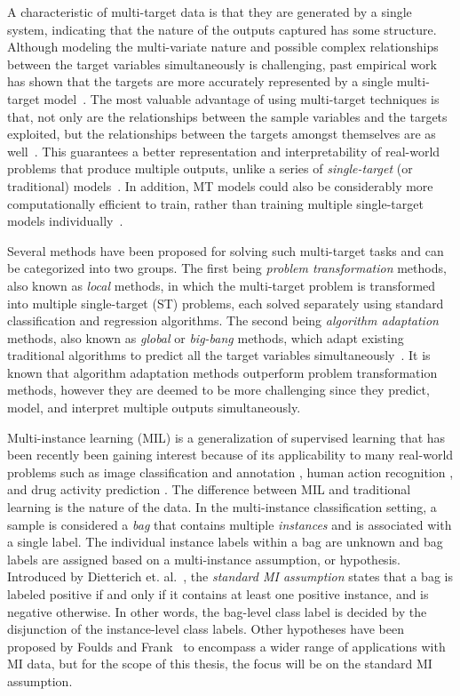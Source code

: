 \documentclass[reqno]{vcuthesis}
\numberwithin{equation}{chapter}
\begin{document}
A characteristic of multi-target data is that they are generated by a single system, indicating that the nature of the outputs captured has some structure. Although modeling the multi-variate nature and possible complex relationships between the target variables simultaneously is challenging, past empirical work has shown that the targets are more accurately represented by a single multi-target model~\cite{Caruana1997,Evgeniou2005}. The most valuable advantage of using multi-target techniques is that, not only are the relationships between the sample variables and the targets exploited, but the relationships between the targets amongst themselves are as well~\cite{Baxter1997,Caruana1997}. This guarantees a better representation and interpretability of real-world problems that produce multiple outputs, unlike a series of \textit{single-target} (or traditional) models~\cite{BenDavic2003}. In addition, MT models could also be considerably more computationally efficient to train, rather than training multiple single-target models individually~\cite{evgeniou2004regularized}. 

Several methods have been proposed for solving such multi-target tasks and can be categorized into two groups. The first being \textit{problem transformation} methods, also known as \textit{local} methods, in which the multi-target problem is transformed into multiple single-target (ST) problems, each solved separately using standard classification and regression algorithms. The second being \textit{algorithm adaptation} methods, also known as \textit{global} or \textit{big-bang} methods, which adapt existing traditional algorithms to predict all the target variables simultaneously~\cite{Borchani2015}. It is known that algorithm adaptation methods outperform problem transformation methods, however they are deemed to be more challenging since they predict, model, and interpret multiple outputs simultaneously. 

Multi-instance learning (MIL) is a generalization of supervised learning that has been recently been gaining interest because of its applicability to many real-world problems such as image classification and annotation \cite{Herman2008}, human action recognition \cite{Yi2016}, and drug activity prediction \cite{Dietterich1997}. The difference between MIL and traditional learning is the nature of the data. In the multi-instance classification setting, a sample is considered a \textit{bag} that contains multiple \textit{instances} and is associated with a single label. The individual instance labels within a bag are unknown and bag labels are assigned based on a multi-instance assumption, or hypothesis. Introduced by Dietterich et. al.~\cite{Dietterich1997}, the \textit{standard MI assumption} states that a bag is labeled positive if and only if it contains at least one positive instance, and is negative otherwise. In other words, the bag-level class label is decided by the disjunction of the instance-level class labels. Other hypotheses have been proposed by Foulds and Frank~\cite{Foulds2010} to encompass a wider range of applications with MI data, but for the scope of this thesis, the focus will be on the standard MI assumption. 
\end{document}
